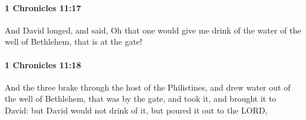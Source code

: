 		\paragraph{1 Chronicles 11:17} %
			\label{1CHRONICLES-11-17}

			And David longed, and said, Oh that one would give me drink of the water of the well of Bethlehem, that is at the gate!


		\paragraph{1 Chronicles 11:18} %
			\label{1CHRONICLES-11-18}

			And the three brake through the host of the Philistines, and drew water out of the well of Bethlehem, that was by the gate, and took it, and brought it to David: but David would not drink of it, but poured it out to the LORD,

